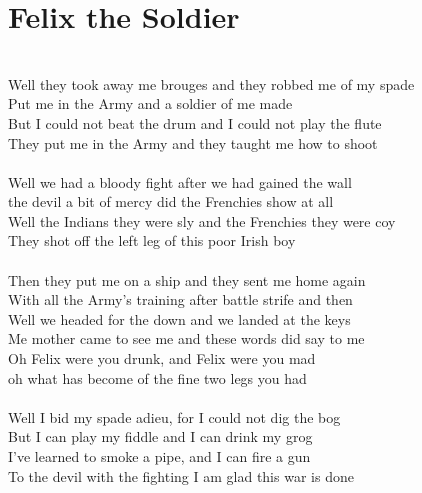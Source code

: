 \documentclass[letterpaper,9pt]{article}
\begin{document}
\section{Felix the Soldier}
\noindent
\\Well they took away me brouges and they robbed me of my spade
\\Put me in the Army and a soldier of me made
\\But I could not beat the drum and I could not play the flute
\\They put me in the Army and they taught me how to shoot
\\
\\Well we had a bloody fight after we had gained the wall
\\the devil a bit of mercy did the Frenchies show at all
\\Well the Indians they were sly and the Frenchies they were coy
\\They shot off the left leg of this poor Irish boy
\\
\\Then they put me on a ship and they sent me home again
\\With all the Army's training after battle strife and then
\\Well we headed for the down and we landed at the keys
\\Me mother came to see me and these words did say to me
\\Oh Felix were you drunk, and Felix were you mad
\\oh what has become of the fine two legs you had
\\
\\Well I bid my spade adieu, for I could not dig the bog
\\But I can play my fiddle and I can drink my grog
\\I've learned to smoke a pipe, and I can fire a gun
\\To the devil with the fighting I am glad this war is done
\end{document}
